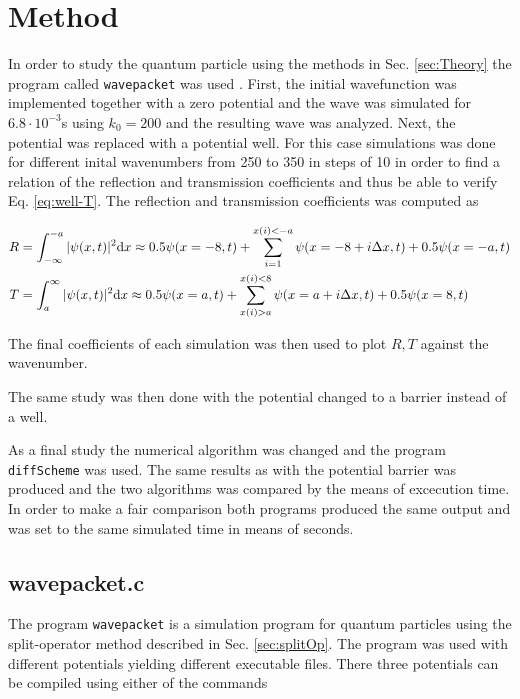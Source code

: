\section{Method}
\label{sec:method of stuff}

In order to study the quantum particle using the methods in Sec. \ref{sec:Theory} the program called \verb|wavepacket| was used \cite{wavepacket}. First, the initial wavefunction was implemented together with a zero potential and the wave was simulated for $6.8 \cdot 10^{-3}$s using $k_0 = 200$ and the resulting wave was analyzed. Next, the potential was replaced with a potential well. For this case simulations was done for different inital wavenumbers from 250 to 350 in steps of 10 in order to find a relation of the reflection and transmission coefficients and thus be able to verify Eq. \eqref{eq:well-T}. The reflection and transmission coefficients was computed as

\begin{equation}
  \label{eq:RTnumerical}
  \begin{split}
    R &= \int_{-\infty}^{-a}|\psi(x,t)|^2\textnormal{d} x \approx 0.5\psi(x=-8,t) + \sum_{i=1}^{x(i)<-a} \psi(x=-8+i\Delta x,t) + 0.5\psi(x=-a,t)\\
    T &= \int_{a}^{\infty}|\psi(x,t)|^2\textnormal{d} x \approx 0.5\psi(x=a,t) + \sum_{x(i)>a}^{x(i)<8} \psi(x=a+i\Delta x,t) + 0.5\psi(x=8,t)\\
  \end{split}
\end{equation}

The final coefficients of each simulation was then used to plot $R,T$ against the wavenumber.

The same study was then done with the potential changed to a barrier instead of a well.

As a final study the numerical algorithm was changed and the program \verb|diffScheme| was used. The same results as with the potential barrier was produced and the two algorithms was compared by the means of excecution time. In order to make a fair comparison both programs produced the same output and was set to the same simulated time in means of seconds.

\subsection{wavepacket.c}

The program \verb|wavepacket| is a simulation program for quantum particles using the split-operator method described in Sec. \eqref{sec:splitOp}. The program was used with different potentials yielding different executable files. There three potentials can be compiled using either of the commands

